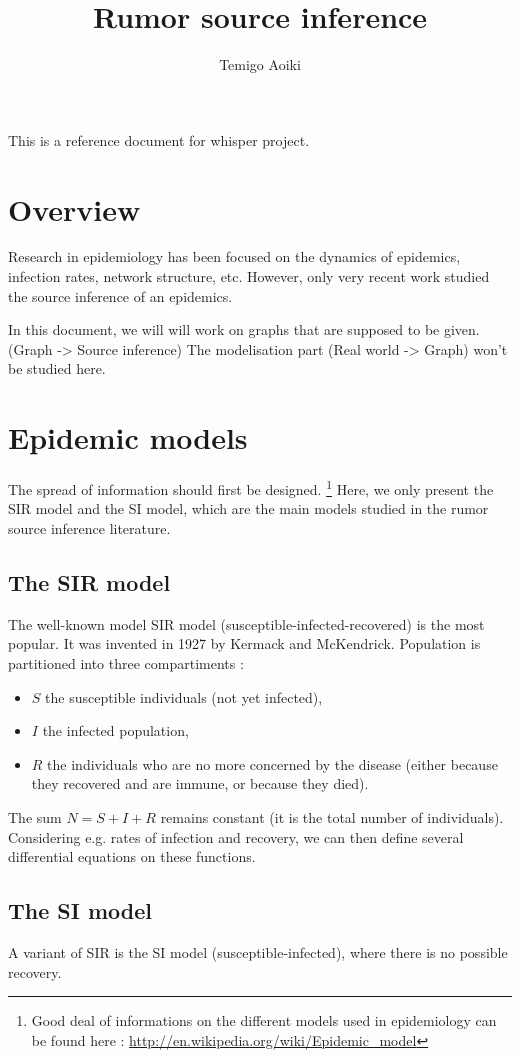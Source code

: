 \documentclass[10pt,a4paper]{article}
\author{Temigo Aoiki}
\title{Rumor source inference}
\begin{document}
\maketitle
This is a reference document for whisper project.

\tableofcontents

\newpage
\section{Overview}
Research in epidemiology has been focused on the dynamics of epidemics, infection rates, network structure, etc. However, only very recent work studied the source inference of an epidemics.

In this document, we will will work on graphs that are supposed to be given. (Graph -> Source inference) The modelisation part (Real world -> Graph) won't be studied here.

\section{Epidemic models}
The spread of information should first be designed. \footnote{Good deal of informations on the different models used in epidemiology can be found here : 
\url{http://en.wikipedia.org/wiki/Epidemic_model}}
Here, we only present the SIR model and the SI model, which are the main models studied in the rumor source inference literature.

\subsection{The SIR model}
The well-known model SIR model (susceptible-infected-recovered) is the most popular. It was invented in 1927 by Kermack and McKendrick.
Population is partitioned into three compartiments : 
\begin{itemize}
\item $S$ the susceptible individuals (not yet infected),
\item $I$ the infected population,
\item $R$ the individuals who are no more concerned by the disease (either because they recovered and are immune, or because they died).
\end{itemize}
The sum $N = S + I + R$ remains constant (it is the total number of individuals).
Considering e.g. rates of infection and recovery, we can then define several differential equations on these functions.

\subsection{The SI model}
A variant of SIR is the SI model (susceptible-infected), where there is no possible recovery.
\end{document}
